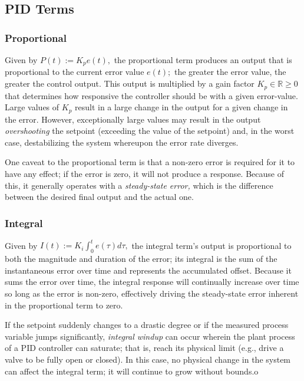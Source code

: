 \documentclass[11pt]{article}
\newcommand{\R}{\mathbb{R}}
\theoremstyle{definition}
\begin{document}
\subsection{PID Terms}

\subsubsection{Proportional}

Given by $P(t) := K_{p}e(t),$ the proportional term produces an output that is proportional to the current error value $e(t);$ the greater
the error value, the greater the control output. This output is multiplied by a gain factor $K_{p} \in \R \geq 0$ that determines how responsive
the controller should be with a given error-value. Large values of $K_{p}$ result in a large change in the output for a given change in the
error. However, exceptionally large values may result in the output \textit{overshooting} the setpoint (exceeding the value of the setpoint)
and, in the worst case, destabilizing the system whereupon the error rate diverges.

One caveat to the proportional term is that a non-zero error is required for it to have any effect; if the error is zero, it will not 
produce a response. Because of this, it generally operates with a \textit{steady-state error,} which is the difference between the desired 
final output and the actual one.

\subsubsection{Integral}

Given by $I(t) := K_{i}\int_{0}^{t}e(\tau)d\tau,$ the integral term's output is proportional to both the magnitude and duration
of the error; its integral is the sum of the instantaneous error over time and represents the accumulated offset. Because it sums
the error over time, the integral response will continually increase over time so long as the error is non-zero, effectively driving
the steady-state error inherent in the proportional term to zero.

If the setpoint suddenly changes to a drastic degree or if the measured process variable jumps significantly, \textit{integral windup}
can occur wherein the plant process of a PID controller can saturate; that is, reach its physical limit (e.g., drive a valve to be fully
open or closed). In this case, no physical change in the system can affect the integral term; it will continue to grow without bounds.o
\end{document}
